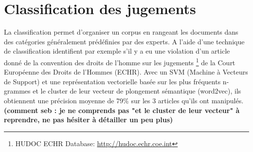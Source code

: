 
\section{Classification des jugements}
La classification permet d'organiser un corpus en rangeant les documents dans des catégories généralement prédéfinies par des experts. A l'aide d'une technique de classification  \cite{Aletras2016predictDecisionECHR} identifient par exemple s'il y a eu une violation d'un article donné de la convention des droits de l'homme sur les jugements \footnote{HUDOC ECHR Database: \url{http://hudoc.echr.coe.int}} de la Court Européenne des Droits de l'Hommes (ECHR). Avec un SVM (Machine à Vecteurs de Support) et une représentation vectorielle basée sur les plus fréquents n-grammes et le cluster de leur vecteur de plongement sémantique (word2vec), ils obtiennent une précision moyenne de 79\% sur les 3 articles qu'ils ont manipulés. \textbf{(comment seb : je ne comprends pas "et le cluster de leur vecteur" à reprendre, ne pas hésiter à détailler un peu plus)}
